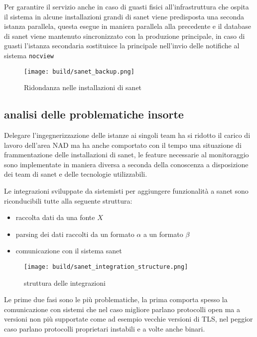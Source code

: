 Per garantire il servizio anche in caso di guasti fisici all'infrastruttura che ospita il sistema in alcune installazioni grandi di sanet viene predisposta una seconda istanza parallela, questa esegue in maniera parallela alla precedente e il database di sanet viene mantenuto sincronizzato con la produzione principale, in caso di guasti l'istanza secondaria sostituisce la principale nell'invio delle notifiche al sistema \verb|nocview|

\begin{figure}[H]
    \centering
    \texttt{[image: build/sanet\_backup.png]}
    \caption{Ridondanza nelle installazioni di sanet}
    \label{fig:enter-label}
\end{figure}

\newpage
\subsection{analisi delle problematiche insorte}

Delegare l'ingegnerizzazione delle istanze ai singoli team ha si ridotto il carico di lavoro dell'area NAD ma ha anche comportato con il tempo una situazione di frammentazione delle installazioni di sanet, le feature necessarie al monitoraggio sono implementate in maniera diversa a seconda della conoscenza a disposizione dei team di sanet e delle tecnologie utilizzabili.

Le integrazioni sviluppate da sistemisti per aggiungere funzionalità a sanet sono riconducibili tutte alla seguente struttura:

\begin{itemize}
  \item{raccolta dati da una fonte \(X\)}
  \item{parsing dei dati raccolti da un formato \(\alpha\) a un formato \(\beta\)}
  \item{comunicazione con il sistema sanet}
\end{itemize}

\begin{figure}[H]
    \centering
    \texttt{[image: build/sanet\_integration\_structure.png]}
    \caption{struttura delle integrazioni}
    \label{fig:enter-label}
\end{figure}

Le prime due fasi sono le più problematiche, la prima comporta spesso la comunicazione con sistemi che nel caso migliore parlano protocolli open ma a versioni non più supportate come ad esempio vecchie versioni di TLS, nel peggior caso parlano protocolli proprietari instabili e a volte anche binari.

